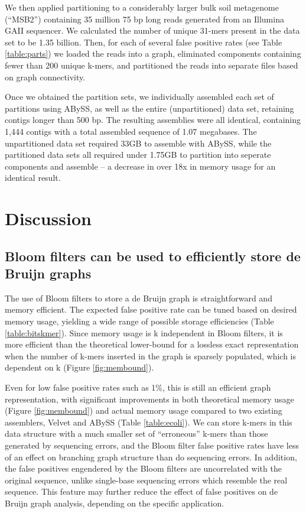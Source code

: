 \documentclass{pnastwo}
\begin{document}
\begin{article}
We then applied partitioning to a considerably larger bulk soil
metagenome (``MSB2'') containing 35 million 75 bp long reads generated
from an Illumina GAII sequencer.  We calculated the number of unique
31-mers present in the data set to be 1.35 billion. Then, for each of
several false positive rates (see Table \ref{table:parts}) we loaded
the reads into a graph, eliminated components containing fewer than
200 unique k-mers, and partitioned the reads into separate files based
on graph connectivity.

Once we obtained the partition sets, we individually assembled each
set of partitions using ABySS, as well as the entire (unpartitioned)
data set, retaining contigs longer than 500 bp.  The resulting
assemblies were all identical, containing 1,444 contigs with a total
assembled sequence of 1.07 megabases.  The unpartitioned data set
required 33GB to assemble with ABySS, while the partitioned data sets
all required under 1.75GB to partition into seperate components and
assemble -- a decrease in over 18x in memory usage for an identical
result.


\section{Discussion}


\subsection{Bloom filters can be used to efficiently store de Bruijn graphs}

The use of Bloom filters to store a de Bruijn graph is straightforward
and memory efficient.  The expected false positive rate can be tuned
based on desired memory usage, yielding a wide range of possible
storage efficiencies (Table \ref{table:bitskmer}). Since memory usage
is k independent in Bloom filters, it is more efficient than the
theoretical lower-bound for a lossless exact representation when the
number of k-mers inserted in the graph is sparsely populated, which is
dependent on k (Figure \ref{fig:membound}).

Even for low false positive rates such as 1\%, this is still an
efficient graph representation, with significant improvements in both
theoretical memory usage (Figure \ref{fig:membound}) and actual memory 
usage compared
to two existing assemblers, Velvet and ABySS (Table
\ref{table:ecoli}).  We can store k-mers in this data structure with a
much smaller set of ``erroneous'' k-mers than those generated by
sequencing errors, and the Bloom filter false positive rates have less
of an effect on branching graph structure than do sequencing errors.
In addition, the false positives engendered by the Bloom filters are
uncorrelated with the original sequence, unlike single-base sequencing
errors which resemble the real sequence.  This feature may further
reduce the effect of false positives on de Bruijn graph analysis,
depending on the specific application.


\end{article}
\end{document}
